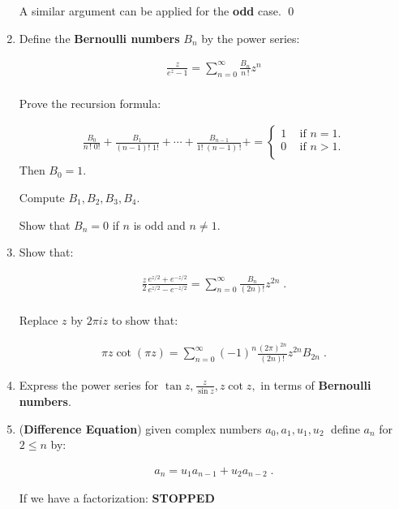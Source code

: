 \begin{enumerate}
    A similar argument can be applied for the \textbf{odd} case.
    \qed
  
    \item Define the \textbf{Bernoulli numbers} $B_n$ by the power series:
  
    \begin{align*}
      \frac{z}{e^z - 1} = \sum_{n = 0}^{\infty}\frac{B_n}{n\,!}z^n \\
    \end{align*}
  
    Prove the recursion formula:
  
    \begin{align*}
      \frac{B_0}{n \, ! \; 0!} + \frac{B_1}{(n - 1)! \; 1!} + \cdots + \frac{B_{n - 1}}{1! \; (n - 1)\,!} + = 
      \begin{cases}
        1 \;\;\; \text{   if } n = 1. \\
        0 \;\;\; \text{   if } n > 1. \\
      \end{cases}
    \end{align*}
    Then $B_0 = 1.$
    
    Compute $B_1, B_2, B_3, B_4.$
    
    Show that $B_n = 0$ if $n$ is odd and $n \not = 1.$
    
    \item Show that:
  
    \begin{align*}
      \frac{z}{2} \frac{e^{z/2} + e^{-z/2}}{e^{z/2} - e^{-z/2}} = \sum_{n = 0}^\infty \frac{B_n}{(2n)!}z^{2n} \;. \\
    \end{align*}
  
    Replace $z$ by $2\pi i z$ to show that:
  
    \begin{align*}
      \pi z \cot(\pi z) = \sum_{n = 0}^\infty (-1)^n \frac{(2\pi)^{2n}}{(2n)!} z^{2n} B_{2n} \;.
    \end{align*}
  
    \item Express the power series for $\tan z , \frac{z}{\sin z}, z \cot z ,$ in terms of \textbf{Bernoulli numbers}.
  
    \item (\textbf{Difference Equation}) given complex numbers $a_0, a_1, u_1, u_2 \;$ define $a_n$ for $2 \leq n$ by:
  
    \begin{align*}
      a_n = u_1 a_{n - 1} +u_2 a_{n - 2} \;.
    \end{align*}
  
    If we have a factorization: \textbf{STOPPED}
  \end{enumerate}